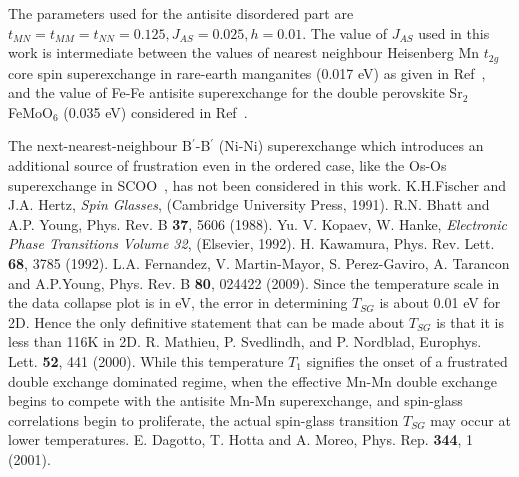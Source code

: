 \documentclass[english,aps,prb,twocolumn,showpacs]{revtex4-1}
\begin{document}
\begin{thebibliography}{99}
 The parameters used for the antisite disordered part are 
 $t_{MN}=t_{MM}=t_{NN}=0.125,J_{AS}=0.025,h=0.01$. The value of $J_{AS}$ used in this work is intermediate
 between the values of nearest neighbour Heisenberg 
 Mn $t_{2g}$ core spin superexchange in rare-earth manganites (0.017 eV) as given in 
 Ref~\cite{Dagotto}, and  the value of  Fe-Fe 
 antisite superexchange for the double perovskite Sr$_{2}$FeMoO$_{6}$ (0.035 eV) considered in Ref~\cite{FGuinea}.

 The next-nearest-neighbour B$^{\prime}$-B$^{\prime}$ (Ni-Ni) superexchange
 which introduces an additional 
 source of frustration even in the ordered case, like the Os-Os superexchange in SCOO~\cite{Mohit},
 has not been considered in this work. 
 K.H.Fischer and J.A. Hertz, {\em Spin Glasses}, (Cambridge University Press, 1991).
 R.N. Bhatt and A.P. Young, Phys. Rev. B {\bf 37}, 5606 (1988).
 Yu. V. Kopaev, W. Hanke, {\em Electronic Phase Transitions Volume 32},
(Elsevier, 1992).
 H. Kawamura, Phys. Rev. Lett. {\bf 68}, 3785 (1992).
 L.A. Fernandez, V. Martin-Mayor, S. Perez-Gaviro, A. Tarancon and A.P.Young,
 Phys. Rev. B {\bf 80}, 024422 (2009).
 Since the temperature scale in the data collapse plot is in eV, the error in determining $T_{SG}$
 is about 0.01 eV for 2D. Hence the only definitive statement that can be made about $T_{SG}$ is that it is less than 116K in 2D.
 R. Mathieu, P. Svedlindh, and P. Nordblad, Europhys. Lett. {\bf 52}, 441 (2000).
 While this temperature $T_{1}$ signifies the onset of a frustrated double exchange dominated regime, 
 when the effective Mn-Mn double exchange  
 begins to compete with the antisite Mn-Mn superexchange,
   and spin-glass correlations begin to proliferate, the actual spin-glass
 transition $T_{SG}$ may occur at lower temperatures.
 E. Dagotto, T. Hotta and A. Moreo, Phys. Rep. {\bf 344}, 1 (2001).
\end{thebibliography}
\end{document}
